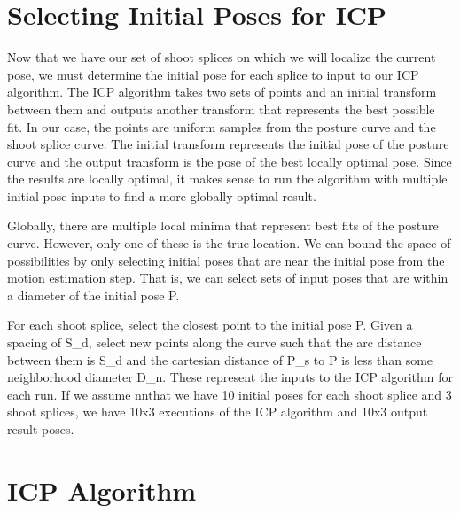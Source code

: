 \section{Selecting Initial Poses for ICP}
\label{selectinginitialposesforicp}

Now that we have our set of shoot splices on which we will localize the current pose, we must determine the initial pose for each splice to input to our ICP algorithm. The ICP algorithm takes two sets of points and an initial transform between them and outputs another transform that represents the best possible fit. In our case, the points are uniform samples from the posture curve and the shoot splice curve. The initial transform represents the initial pose of the posture curve and the output transform is the pose of the best locally optimal pose. Since the results are locally optimal, it makes sense to run the algorithm with multiple initial pose inputs to find a more globally optimal result.

Globally, there are multiple local minima that represent best fits of the posture curve. However, only one of these is the true location. We can bound the space of possibilities by only selecting initial poses that are near the initial pose from the motion estimation step. That is, we can select sets of input poses that are within a diameter of the initial pose P.

For each shoot splice, select the closest point to the initial pose P. Given a spacing of S\_d, select new points along the curve such that the arc distance between them is S\_d and the cartesian distance of P\_s to P is less than some neighborhood diameter D\_n. These represent the inputs to the ICP algorithm for each run. If we assume nnthat we have 10 initial poses for each shoot splice and 3 shoot splices, we have 10x3 executions of the ICP algorithm and 10x3 output result poses.

\section{ICP Algorithm}
\label{icpalgorithm}


